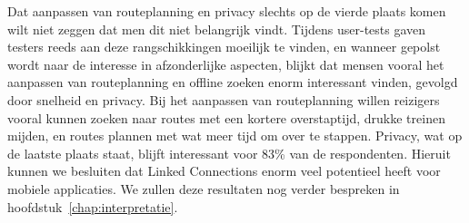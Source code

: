 Dat aanpassen van routeplanning en privacy slechts op de vierde plaats komen wilt niet zeggen dat men dit niet belangrijk vindt. Tijdens user-tests gaven testers reeds aan deze rangschikkingen moeilijk te vinden, en wanneer gepolst wordt naar de interesse in afzonderlijke aspecten, blijkt dat mensen vooral het aanpassen van routeplanning en offline zoeken enorm interessant vinden, gevolgd door snelheid en privacy. Bij het aanpassen van routeplanning willen reizigers vooral kunnen zoeken naar routes met een kortere overstaptijd, drukke treinen mijden, en routes plannen met wat meer tijd om over te stappen. Privacy, wat op de laatste plaats staat, blijft interessant voor 83\% van de respondenten. Hieruit kunnen we besluiten dat Linked Connections enorm veel potentieel heeft voor mobiele applicaties. We zullen deze resultaten nog verder bespreken in hoofdstuk~\ref{chap:interpretatie}.

